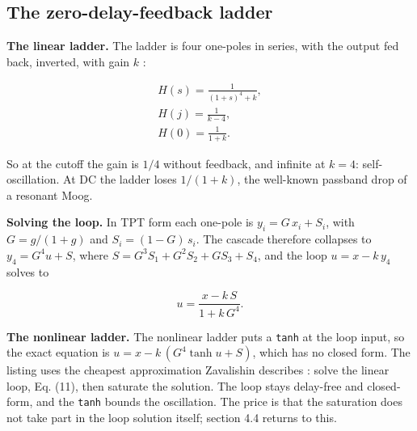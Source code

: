 \documentclass[conference]{IEEEtran}
\begin{document}
\setcounter{subsection}{5}
\subsection{The zero-delay-feedback ladder}
\textbf{The linear ladder.} The ladder is four one-poles in series, with the output fed back, inverted, with gain $k$ \cite{r33}:

\begin{equation*}
\begin{gathered}
H(s) = \frac{1}{(1+s)^4 + k}, \\
H(j) = \frac{1}{k - 4}, \\
H(0) = \frac{1}{1 + k}.
\end{gathered}
\tag{10}
\end{equation*}

So at the cutoff the gain is $1/4$ without feedback, and infinite at $k = 4$: self-oscillation. At DC the ladder loses $1/(1+k)$, the well-known passband drop of a resonant Moog.

\textbf{Solving the loop.} In TPT form each one-pole is $y_i = G\,x_i + S_i$, with $G = g/(1+g)$ and $S_i = (1-G)\,s_i$. The cascade therefore collapses to $y_4 = G^4 u + S$, where $S = G^3 S_1 + G^2 S_2 + G S_3 + S_4$, and the loop $u = x - k\,y_4$ solves to \cite{r42}

\begin{equation*}
u = \frac{x - k\,S}{1 + k\,G^4}.
\tag{11}
\end{equation*}

\textbf{The nonlinear ladder.} The nonlinear ladder puts a \texttt{tanh} at the loop input, so the exact equation is $u = x - k\,(G^4 \tanh u + S)$, which has no closed form. The listing uses the cheapest approximation Zavalishin describes \cite{r42}: solve the linear loop, Eq. (11), then saturate the solution. The loop stays delay-free and closed-form, and the \texttt{tanh} bounds the oscillation. The price is that the saturation does not take part in the loop solution itself; section 4.4 returns to this.
\end{document}
